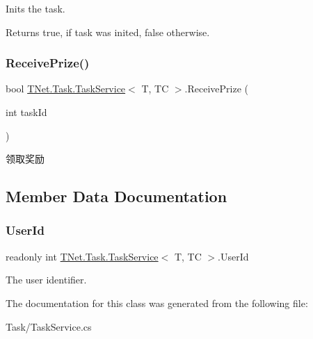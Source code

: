 Inits the task. 

\begin{DoxyReturn}{Returns}
{\ttfamily true}, if task was inited, {\ttfamily false} otherwise.
\end{DoxyReturn}
\mbox{\label{class_t_net_1_1_task_1_1_task_service_a160b3a3823aaeeb214fe082d96983913}} 
\subsubsection{\texorpdfstring{Receive\+Prize()}{ReceivePrize()}}
{\footnotesize\ttfamily bool \mbox{\hyperlink{class_t_net_1_1_task_1_1_task_service}{T\+Net.\+Task.\+Task\+Service}}$<$ T, TC $>$.Receive\+Prize (\begin{DoxyParamCaption}\item[{int}]{task\+Id }\end{DoxyParamCaption})}



领取奖励 



\subsection{Member Data Documentation}
\mbox{\label{class_t_net_1_1_task_1_1_task_service_aca210228a695a1f110af99bcce5808aa}} 
\subsubsection{\texorpdfstring{User\+Id}{UserId}}
{\footnotesize\ttfamily readonly int \mbox{\hyperlink{class_t_net_1_1_task_1_1_task_service}{T\+Net.\+Task.\+Task\+Service}}$<$ T, TC $>$.User\+Id\hspace{0.3cm}{\ttfamily [protected]}}



The user identifier. 



The documentation for this class was generated from the following file\+:\begin{DoxyCompactItemize}
\item 
Task/Task\+Service.\+cs\end{DoxyCompactItemize}

